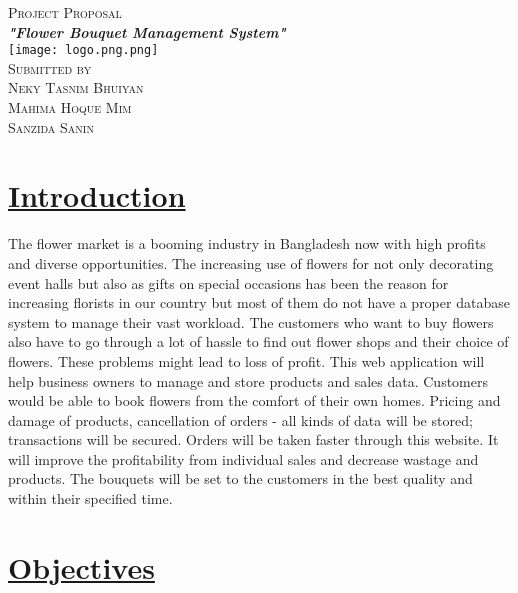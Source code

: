 \documentclass{article}
\begin{document}
\begin{titlepage}
\begin{center}
    \textsc{\LARGE Project Proposal}\\
    \huge{\bfseries \textit{"Flower Bouquet Management System"}}\\
    [3cm]
    
    \texttt{[image: logo.png.png]}\\
    [3cm]
    
    
    \textsc{\Large Submitted by\\Neky Tasnim Bhuiyan\\Mahima Hoque Mim\\Sanzida Sanin}
    
\end{center}
\end{titlepage}

\newpage
\section*{\underline{Introduction}}

The flower market is a booming industry in Bangladesh now with high profits and diverse opportunities. The increasing use of flowers for not only decorating event halls but also as gifts on special occasions has been the reason for increasing florists in our country but most of them do not have a proper database system to manage their vast workload. The customers who want to buy flowers also have to go through a lot of hassle to find out flower shops and their choice of flowers. These problems might lead to loss of profit. This web application will help business owners to manage and store products and sales data. Customers would be able to book flowers from the comfort of their own homes. Pricing and damage of products, cancellation of orders - all kinds of data will be stored; transactions will be secured. Orders will be taken faster through this website. It will improve the profitability from individual sales and decrease wastage and products. The bouquets will be set to the customers in the best quality and within their specified time.

\section*{\underline{Objectives}}
\end{document}
